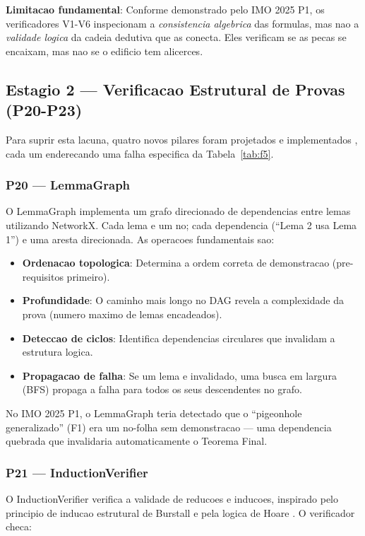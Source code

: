 \documentclass[5p]{elsarticle}
\begin{document}
\textbf{Limitacao fundamental}: Conforme demonstrado pelo IMO 2025 P1, os
verificadores V1-V6 inspecionam a \textit{consistencia algebrica} das formulas,
mas nao a \textit{validade logica} da cadeia dedutiva que as conecta. Eles
verificam se as pecas se encaixam, mas nao se o edificio tem alicerces.

\subsection{Estagio 2 — Verificacao Estrutural de Provas (P20-P23)}

Para suprir esta lacuna, quatro novos pilares foram projetados e implementados
\cite{dossier2026}, cada um enderecando uma falha especifica da Tabela~\ref{tab:f5}.

\subsubsection{P20 — LemmaGraph}

O LemmaGraph implementa um grafo direcionado de dependencias entre lemas
utilizando NetworkX. Cada lema e um no; cada dependencia (``Lema 2 usa Lema 1'')
e uma aresta direcionada. As operacoes fundamentais sao:

\begin{itemize}
  \item \textbf{Ordenacao topologica}: Determina a ordem correta de demonstracao
    (pre-requisitos primeiro).
  \item \textbf{Profundidade}: O caminho mais longo no DAG revela a complexidade
    da prova (numero maximo de lemas encadeados).
  \item \textbf{Deteccao de ciclos}: Identifica dependencias circulares que
    invalidam a estrutura logica.
  \item \textbf{Propagacao de falha}: Se um lema e invalidado, uma busca em
    largura (BFS) propaga a falha para todos os seus descendentes no grafo.
\end{itemize}

No IMO 2025 P1, o LemmaGraph teria detectado que o ``pigeonhole generalizado''
(F1) era um no-folha sem demonstracao --- uma dependencia quebrada que
invalidaria automaticamente o Teorema Final.

\subsubsection{P21 — InductionVerifier}

O InductionVerifier verifica a validade de reducoes e inducoes, inspirado
pelo principio de inducao estrutural de Burstall \cite{burstall1969} e pela
logica de Hoare \cite{hoare1969}. O verificador checa:
\end{document}
